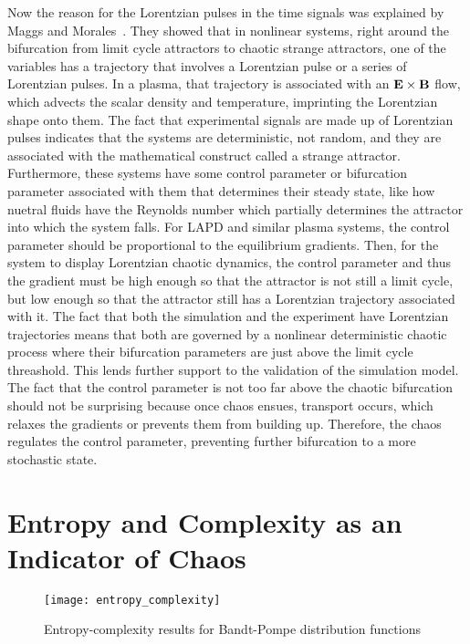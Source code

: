 Now the reason for the Lorentzian pulses in the time signals was explained by Maggs and Morales~\cite{maggs2012a}. They showed that in nonlinear systems, 
right around the bifurcation from limit cycle attractors to chaotic strange attractors, one of the variables has a trajectory that involves a Lorentzian pulse or a series of Lorentzian pulses.
In a plasma, that trajectory is associated with an ${\bf E \times B}$ flow, which advects the scalar density and temperature, imprinting the Lorentzian shape onto them.
The fact that experimental signals are made up of Lorentzian pulses indicates that the systems are deterministic, not random, and they are associated with the mathematical construct called
a strange attractor. Furthermore, these systems have some control parameter or bifurcation parameter associated with them that determines their steady state, 
like how nuetral fluids have the Reynolds number which partially determines the attractor into which the system falls. For LAPD and similar plasma systems, the control parameter should be
proportional to the equilibrium gradients. Then, for the system to display Lorentzian chaotic dynamics, the control parameter and thus the gradient must be high enough so that the attractor is not
still a limit cycle, but low enough so that the attractor still has a Lorentzian trajectory associated with it.
The fact that both the simulation and the experiment have Lorentzian trajectories means that both are governed by a nonlinear deterministic chaotic process where their bifurcation parameters
are just above the limit cycle threashold. This lends further support to the validation of the simulation model. The fact that the control parameter is not too far above the chaotic bifurcation
should not be surprising because once chaos ensues, transport occurs, which relaxes the gradients or prevents them from building up. Therefore, the chaos regulates the control parameter,
preventing further bifurcation to a more stochastic state.

\section{Entropy and Complexity as an Indicator of Chaos}
\label{s_ent_comp}

\begin{figure}[!ht]
\centerline{\texttt{[image: entropy\_complexity]}}
\caption{Entropy-complexity results for Bandt-Pompe distribution functions}
\label{entropy_complexity}
\end{figure}
